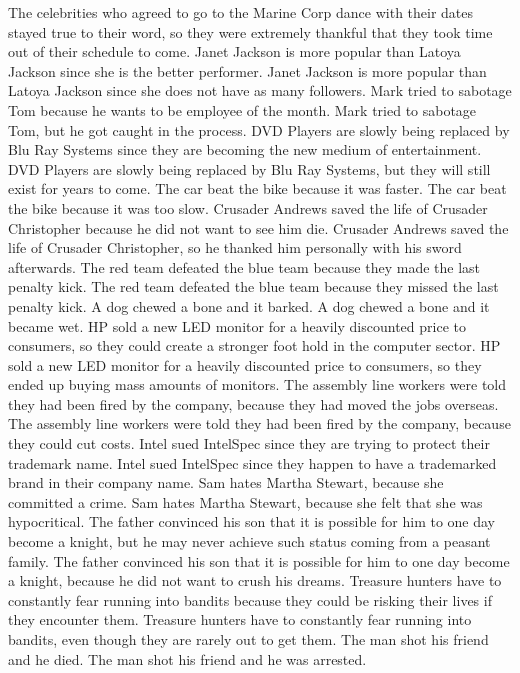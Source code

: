 \documentclass{article}
\begin{document}
\begin{enumerate}
The celebrities who agreed to go to the Marine Corp dance with their dates stayed true to their word, so they were extremely thankful that they took time out of their schedule to come.
Janet Jackson is more popular than Latoya Jackson since she is the better performer.
Janet Jackson is more popular than Latoya Jackson since she does not have as many followers.
Mark tried to sabotage Tom because he wants to be employee of the month.
Mark tried to sabotage Tom, but he got caught in the process.
DVD Players are slowly being replaced by Blu Ray Systems since they are becoming the new medium of entertainment.
DVD Players are slowly being replaced by Blu Ray Systems, but they will still exist for years to come.
The car beat the bike because it was faster.
The car beat the bike because it was too slow.
Crusader Andrews saved the life of Crusader Christopher because he did not want to see him die.
Crusader Andrews saved the life of Crusader Christopher, so he thanked him personally with his sword afterwards.
The red team defeated the blue team because they made the last penalty kick.
The red team defeated the blue team because they missed the last penalty kick.
A dog chewed a bone and it barked.
A dog chewed a bone and it became wet.
HP sold a new LED monitor for a heavily discounted price to consumers, so they could create a stronger foot hold in the computer sector.
HP sold a new LED monitor for a heavily discounted price to consumers, so they ended up buying mass amounts of monitors.
The assembly line workers were told they had been fired by the company, because they had moved the jobs overseas.
The assembly line workers were told they had been fired by the company, because they could cut costs.
Intel sued IntelSpec since they are trying to protect their trademark name.
Intel sued IntelSpec since they happen to have a trademarked brand in their company name.
Sam hates Martha Stewart, because she committed a crime.
Sam hates Martha Stewart, because she felt that she was hypocritical.
The father convinced his son that it is possible for him to one day become a knight, but he may never achieve such status coming from a peasant family.
The father convinced his son that it is possible for him to one day become a knight, because he did not want to crush his dreams.
Treasure hunters have to constantly fear running into bandits because they could be risking their lives if they encounter them.
Treasure hunters have to constantly fear running into bandits, even though they are rarely out to get them.
The man shot his friend and he died.
The man shot his friend and he was arrested.

\end{enumerate}
\end{document}
